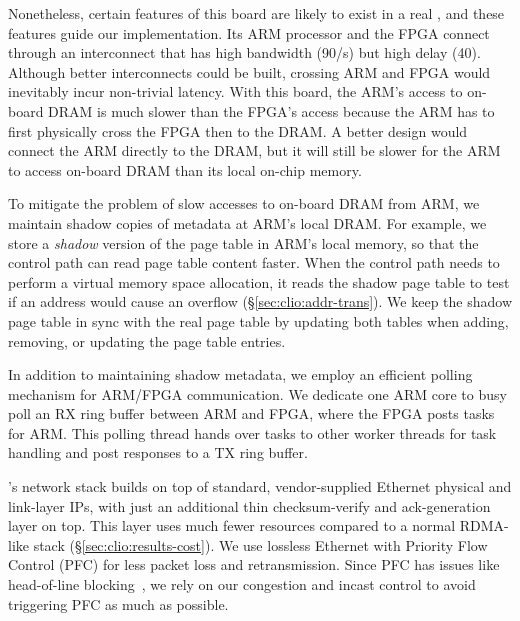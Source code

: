 Nonetheless, certain features of this board are likely to exist in a real \sysboard,
and these features guide our implementation.
Its ARM processor and the FPGA connect through an interconnect that has high bandwidth (90\GB/s) but high delay (40\mus).
Although better interconnects could be built, crossing ARM and FPGA would inevitably incur non-trivial latency.
With this board, the ARM's access to on-board DRAM is much slower than the FPGA's access because the ARM has to first physically cross the FPGA then to the DRAM.
A better design would connect the ARM directly to the DRAM, 
but it will still be slower for the ARM to access on-board DRAM than its local on-chip memory.

To mitigate the problem of slow accesses to on-board DRAM from ARM,
we maintain shadow copies of metadata at ARM's local DRAM.
For example, we store a {\em shadow} version of the page table in ARM's local memory,
so that the control path can read page table content faster.
When the control path needs to perform a virtual memory space allocation, it reads the shadow page table to test if an address would cause an overflow (\S\ref{sec:clio:addr-trans}).
We keep the shadow page table in sync with the real page table by updating both tables when adding, removing, or updating the page table entries.
%

In addition to maintaining shadow metadata, we employ an efficient polling mechanism for ARM/FPGA communication.
We dedicate one ARM core to busy poll an RX ring buffer between ARM and FPGA,
where the FPGA posts tasks for ARM.
This polling thread hands over tasks to other worker threads for task handling %
and post responses to a TX ring buffer.

\sysboard's network stack builds on top of standard, vendor-supplied Ethernet physical and link-layer IPs, with just an additional thin checksum-verify and ack-generation layer on top.
This layer uses much fewer resources compared to a normal RDMA-like stack (\S\ref{sec:clio:results-cost}).
%
We use lossless Ethernet with Priority Flow Control (PFC) for less packet loss and retransmission. Since PFC has issues like head-of-line blocking~\cite{DCQCN-sigcomm15,hpcc-sigcomm19,alibaba-rdma-nsdi21,IRN}, we rely on our congestion and incast control to avoid triggering PFC as much as possible.

